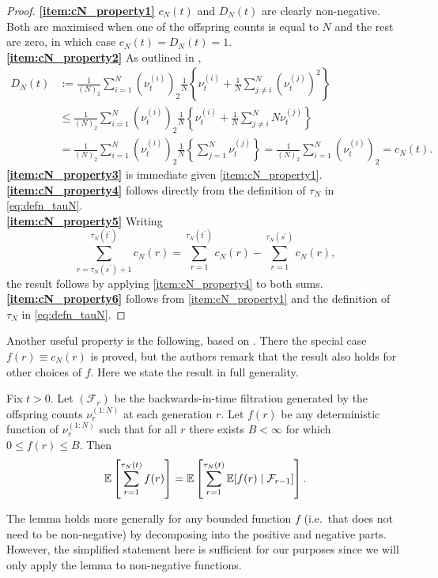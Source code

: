 \begin{proof}
\textbf{\ref{item:cN_property1}}  $c_N(t)$ and $D_N(t)$ are clearly non-negative. Both are maximised when one of the offspring counts is equal to $N$ and the rest are zero, in which case $c_N(t) = D_N(t) = 1$.\\
\textbf{\ref{item:cN_property2}} As outlined in \textcite[p.9]{koskela2018},
\begin{align*}
D_N(t) &:= \frac{1}{(N)_2} \sum_{i=1}^N (\nu_t^{(i)})_2 \frac{1}{N} \left\{  \nu_t^{(i)} + \frac{1}{N} \sum_{j\neq i}^N (\nu_t^{(j)})^2 \right\} \\
&\leq \frac{1}{(N)_2} \sum_{i=1}^N (\nu_t^{(i)})_2 \frac{1}{N} \left\{  \nu_t^{(i)} + \frac{1}{N} \sum_{j\neq i}^N N \nu_t^{(j)} \right\} \\
&= \frac{1}{(N)_2} \sum_{i=1}^N (\nu_t^{(i)})_2 \frac{1}{N} \left\{ \sum_{j =1}^N \nu_t^{(j)} \right\}
= \frac{1}{(N)_2} \sum_{i=1}^N (\nu_t^{(i)})_2
= c_N(t) .
\end{align*}
\textbf{\ref{item:cN_property3}} is immediate given \ref{item:cN_property1}.\\
\textbf{\ref{item:cN_property4}} follows directly from the definition of $\tau_N$ in \eqref{eq:defn_tauN}.\\
\textbf{\ref{item:cN_property5}} Writing
\begin{equation*}
\sum_{r=\tau_N(s^\prime)+1}^{\tau_N(t^\prime)} c_N(r)
= \sum_{r=1}^{\tau_N(t^\prime)} c_N(r) 
        - \sum_{r=1}^{\tau_N(s^\prime)} c_N(r) ,
\end{equation*}
the result follows by applying \ref{item:cN_property4} to both sums.\\
\textbf{\ref{item:cN_property6}} follows from \ref{item:cN_property1} and the definition of $\tau_N$ in \eqref{eq:defn_tauN}.
\end{proof}


Another useful property is the following, based on \textcite[Lemma 2]{koskela2018}. There the special case $f(r) \equiv c_N(r)$ is proved, but the authors remark that the result also holds for other choices of $f$. Here we state the result in full generality.

\begin{lemma}\label{thm:kjjslemma2}
Fix $t>0$.
Let $(\mathcal{F}_r)$ be the backwards-in-time filtration generated by the offspring counts $\nu_r^{(1:N)}$ at each generation $r$.
Let $f(r)$ be any deterministic function of $\nu_r^{(1:N)}$ such that for all $r$ there exists $B<\infty$ for which $0\leq f(r) \leq B$.
Then
\begin{equation*}
\mathbb{E} \left[ \sum_{r=1}^{\tau_N(t)} f(r) \right] 
= \mathbb{E} \left[ \sum_{r=1}^{\tau_N(t)} \mathbb{E} [ f(r) \mid \mathcal{F}_{r-1} ] \right] .
\end{equation*}
\end{lemma}
The lemma holds more generally for any bounded function $f$ (i.e.\ that does not need to be non-negative) by decomposing into the positive and negative parts. However, the simplified statement here is sufficient for our purposes since we will only apply the lemma to non-negative functions.

